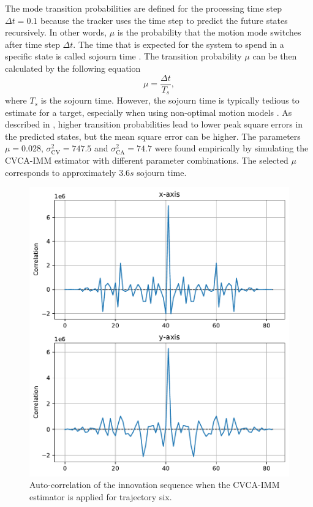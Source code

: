 \documentclass[english, 12pt, a4paper, elec, utf8, a-1b, online]{aaltothesis}
\numberwithin{equation}{section}
\newcommand{\varcv}{\sigma_\text{CV}^2}
\newcommand{\varca}{\sigma_\text{CA}^2}
\newcommand{\msp}{\mu}
\newcommand{\dt}{\Delta t}
\begin{document}
The mode transition probabilities are defined for the processing time step $\dt=0.1$ because the tracker uses the time step to predict the future states recursively.
In other words, $\msp$ is the probability that the motion mode switches after time step $\dt$.
The time that is expected for the system to spend in a specific state is called sojourn time \cite{Simeonova2002}.
The transition probability $\msp$ can be then calculated by the following equation
\begin{equation}
   \msp = \frac{\dt}{T_s},
\end{equation}
where $T_s$ is the sojourn time.
However, the sojourn time is typically tedious to estimate for a target, especially when using non-optimal motion models \cite{Simeonova2002}.
As described in \cite{Simeonova2002}, higher transition probabilities lead to lower peak square errors in the predicted states, but the mean square error can be higher.
The parameters $\msp=0.028$, $\varcv=747.5$ and $\varca=74.7$ were found empirically by simulating the CVCA-IMM estimator with different parameter combinations.
The selected $\msp$ corresponds to approximately $3.6s$ sojourn time.

\begin{figure}[bt]
    \centering
    \includegraphics[width=0.8\linewidth]{figures/benchmark/IMM/correlation_imm.pdf}
    \caption{Auto-correlation of the innovation sequence when the CVCA-IMM estimator is applied for trajectory six.}
    \label{fig:auto_correlation}
\end{figure}
\end{document}
